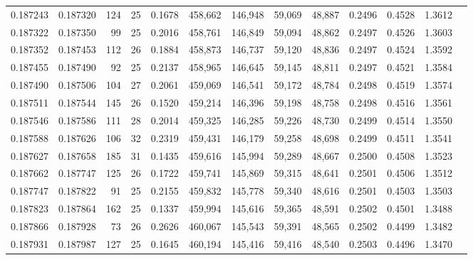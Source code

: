 \begin{tabular}{rrrrrrrrrrrrr}
0.187243 & 0.187320 & 124 &  25 &                                     0.1678 & 458,662 & 146,948 &  59,069 &  48,887 & 0.2496 & 0.4528 & 1.3612 \\
0.187322 & 0.187350 &  99 &  25 &                                     0.2016 & 458,761 & 146,849 &  59,094 &  48,862 & 0.2497 & 0.4526 & 1.3603 \\
0.187352 & 0.187453 & 112 &  26 &                                     0.1884 & 458,873 & 146,737 &  59,120 &  48,836 & 0.2497 & 0.4524 & 1.3592 \\
0.187455 & 0.187490 &  92 &  25 &                                     0.2137 & 458,965 & 146,645 &  59,145 &  48,811 & 0.2497 & 0.4521 & 1.3584 \\
0.187490 & 0.187506 & 104 &  27 &                                     0.2061 & 459,069 & 146,541 &  59,172 &  48,784 & 0.2498 & 0.4519 & 1.3574 \\
0.187511 & 0.187544 & 145 &  26 &                                     0.1520 & 459,214 & 146,396 &  59,198 &  48,758 & 0.2498 & 0.4516 & 1.3561 \\
0.187546 & 0.187586 & 111 &  28 &                                     0.2014 & 459,325 & 146,285 &  59,226 &  48,730 & 0.2499 & 0.4514 & 1.3550 \\
0.187588 & 0.187626 & 106 &  32 &                                     0.2319 & 459,431 & 146,179 &  59,258 &  48,698 & 0.2499 & 0.4511 & 1.3541 \\
0.187627 & 0.187658 & 185 &  31 &                                     0.1435 & 459,616 & 145,994 &  59,289 &  48,667 & 0.2500 & 0.4508 & 1.3523 \\
0.187662 & 0.187747 & 125 &  26 &                                     0.1722 & 459,741 & 145,869 &  59,315 &  48,641 & 0.2501 & 0.4506 & 1.3512 \\
0.187747 & 0.187822 &  91 &  25 &                                     0.2155 & 459,832 & 145,778 &  59,340 &  48,616 & 0.2501 & 0.4503 & 1.3503 \\
0.187823 & 0.187864 & 162 &  25 &                                     0.1337 & 459,994 & 145,616 &  59,365 &  48,591 & 0.2502 & 0.4501 & 1.3488 \\
0.187866 & 0.187928 &  73 &  26 &                                     0.2626 & 460,067 & 145,543 &  59,391 &  48,565 & 0.2502 & 0.4499 & 1.3482 \\
0.187931 & 0.187987 & 127 &  25 &                                     0.1645 & 460,194 & 145,416 &  59,416 &  48,540 & 0.2503 & 0.4496 & 1.3470 \\

\end{tabular}
